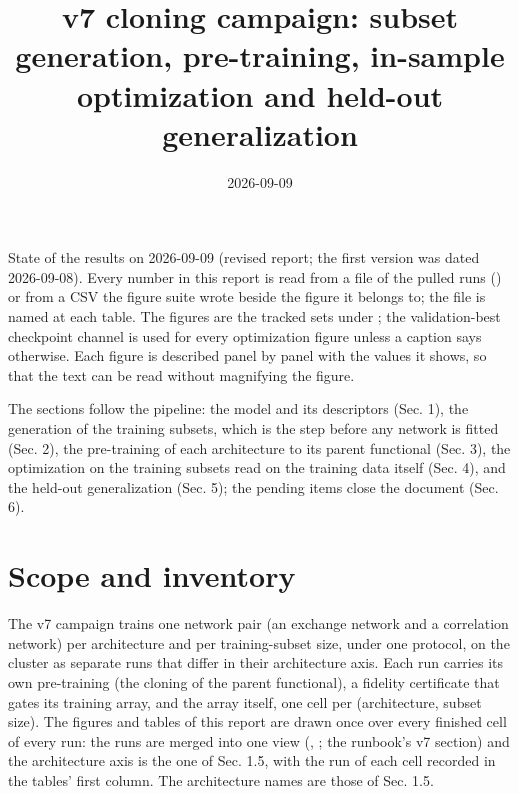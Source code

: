 \documentclass[10pt,a4paper]{article}
\begin{document}
\title{v7 cloning campaign: subset generation, pre-training, in-sample optimization and held-out generalization}
\author{}\date{2026-09-09}
\maketitle


State of the results on 2026-09-09 (revised report; the first version was dated 2026-09-08). Every number in this report is read from a file of the pulled runs () or from a CSV the figure suite wrote beside the figure it belongs to; the file is named at each table. The figures are the tracked sets under ; the validation-best checkpoint channel is used for every optimization figure unless a caption says otherwise. Each figure is described panel by panel with the values it shows, so that the text can be read without magnifying the figure.

The sections follow the pipeline: the model and its descriptors (Sec. 1), the generation of the training subsets, which is the step before any network is fitted (Sec. 2), the pre-training of each architecture to its parent functional (Sec. 3), the optimization on the training subsets read on the training data itself (Sec. 4), and the held-out generalization (Sec. 5); the pending items close the document (Sec. 6).

\section*{Scope and inventory}

The v7 campaign trains one network pair (an exchange network and a correlation network) per architecture and per training-subset size, under one protocol, on the cluster as separate runs that differ in their architecture axis. Each run carries its own pre-training (the cloning of the parent functional), a fidelity certificate that gates its training array, and the array itself, one cell per (architecture, subset size). The figures and tables of this report are drawn once over every finished cell of every run: the runs are merged into one view (, ; the runbook's v7 section) and the architecture axis is the one of Sec. 1.5, with the run of each cell recorded in the tables' first column. The architecture names are those of Sec. 1.5.
\end{document}

